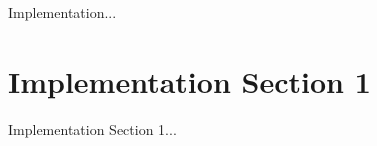 \label{sec:3}

Implementation...

\section{Implementation Section 1}
\label{sec:3.1}

Implementation Section 1... 

